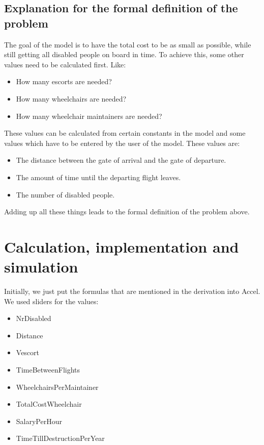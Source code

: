 \documentclass[a4paper, 11pt, notitlepage]{report}
\begin{document}
	\section{Explanation for the formal definition of the problem}
	The goal of the model is to have the total cost to be as small as possible, while still getting all disabled people on board in time. To achieve this, some other values need to be calculated first. Like:
\begin{itemize}
\itemsep0em
  \item How many escorts are needed?
  \item How many wheelchairs are needed?
  \item How many wheelchair maintainers are needed?
\end{itemize}
These values can be calculated from certain constants in the model and some values which have to be entered by the user of the model. These values are:
\begin{itemize}
\itemsep0em
  \item The distance between the gate of arrival and the gate of departure.
  \item The amount of time until the departing flight leaves.
  \item The number of disabled people.
\end{itemize}
Adding up all these things leads to the formal definition of the problem above.


\chapter{Calculation, implementation and simulation}
    Initially, we just put the formulas that are mentioned in the derivation into Accel. We used sliders for the values:
    \begin{itemize}
    \itemsep0em
    \item\vspace{-8pt} NrDisabled
    \item Distance
    \item Vescort
    \item TimeBetweenFlights
    \item WheelchairsPerMaintainer
    \item TotalCostWheelchair
    \item SalaryPerHour
    \item TimeTillDestructionPerYear
    \end{itemize}
\end{document}

